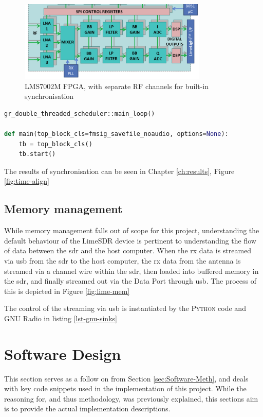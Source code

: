 \documentclass[class=report,11pt,crop=false]{standalone}
\begin{document}
\begin{figure}[h]
    \centering
    \includegraphics[width=0.8\textwidth]{Images/diagrams/lms7002.png}
    \caption{LMS7002M FPGA, with separate RF channels for built-in synchronisation \cite{myriad}}
    \label{fig:lms7002}
\end{figure}

\begin{lstlisting}[language={Python}, caption={Function calls made from \emph{main()} function to the \emph{work()} function in GNU Radio python script}, label={lst-work}]
gr_double_threaded_scheduler::main_loop()

def main(top_block_cls=fmsig_savefile_noaudio, options=None):
    tb = top_block_cls()
    tb.start()
\end{lstlisting}
The results of synchronisation can be seen in Chapter \ref{ch:results}, Figure \ref{fig:time-align}


\subsection{Memory management}
While memory management falls out of scope for this project, understanding the default behaviour of the LimeSDR device is pertinent to understanding the flow of data between the \gls{sdr} and the host computer. When the \gls{rx} data is streamed via \gls{usb} from the \gls{sdr} to the host computer, the \gls{rx} data from the antenna is streamed via a channel wire within the \gls{sdr}, then loaded into buffered memory in the \gls{sdr}, and finally streamed out via the Data Port through \gls{usb}. The process of this is depicted in Figure \ref{fig:lime-mem}


The control of the streaming via \gls{usb} is instantiated by the \textsc{Python} code and GNU Radio in listing \ref{lst-gnu-sinks}


\section{Software Design \label{sec:Design/Software}}
This section serves as a follow on from Section \ref{sec:Software-Meth}, and deals with key code snippets used in the implementation of this project. While the reasoning for, and thus methodology, was previously explained, this sections aim is to provide the actual implementation descriptions.
\end{document}
